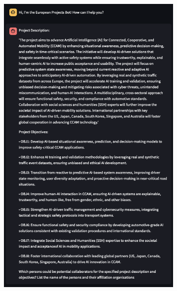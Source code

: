 \begin{figure}[h]
    \centering
    \begin{subfigure}{0.45\textwidth}
        \centering
        \includegraphics[width=.7\textwidth]{figures/implementation/example-collaborators-recommendation-question.png}
        \caption{}
        \label{fig:example-collaborators-question}
    \end{subfigure}
    \hfill
    \begin{subfigure}{0.45\textwidth}
        \centering

\end{subfigure}
\end{figure}
